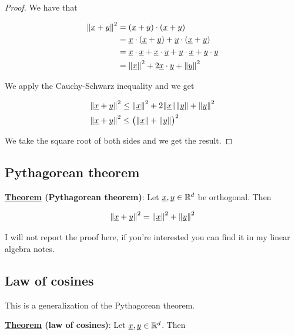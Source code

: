 \documentclass[10pt]{extarticle}
\renewcommand{\vec}[1]{\underbar{\ensuremath{#1}}}
\begin{document}
\begin{proof}
    We have that

    \begin{align*}
        \norm{\vec{x} + \vec{y}}^2 & = (\vec{x} + \vec{y}) \cdot (\vec{x} + \vec{y})                                                                         \\
                                               & = \vec{x} \cdot (\vec{x} + \vec{y}) + \vec{y} \cdot (\vec{x} + \vec{y})                                     \\
                                               & = \vec{x} \cdot \vec{x} + \vec{x} \cdot \vec{y} + \vec{y} \cdot \vec{x} + \vec{y} \cdot \vec{y} \\
                                               & = \norm{\vec{x}}^2 + 2 \vec{x} \cdot \vec{y} + \norm{\vec{y}}^2
    \end{align*}

    We apply the Cauchy-Schwarz inequality and we get

    \begin{align*}
        \norm{\vec{x} + \vec{y}}^2 & \leq \norm{\vec{x}}^2 + 2 \norm{\vec{x}} \norm{\vec{y}} + \norm{\vec{y}}^2 \\
        \norm{\vec{x} + \vec{y}}^2 & \leq \left(\norm{\vec{x}} + \norm{\vec{y}}\right)^2
    \end{align*}

    We take the square root of both sides and we get the result.
\end{proof}

\subsection{Pythagorean theorem}

\textbf{\underline{Theorem} (Pythagorean theorem)}: Let $\vec{x}, \vec{y} \in \R^d$ be orthogonal. Then

$$
    \norm{\vec{x} + \vec{y}}^2 = \norm{\vec{x}}^2 + \norm{\vec{y}}^2
$$

I will not report the proof here, if you're interested you can find it in my linear algebra notes.

\subsection{Law of cosines}

This is a generalization of the Pythagorean theorem.

\textbf{\underline{Theorem} (law of cosines)}: Let $\vec{x}, \vec{y} \in \R^d$. Then
\end{document}
